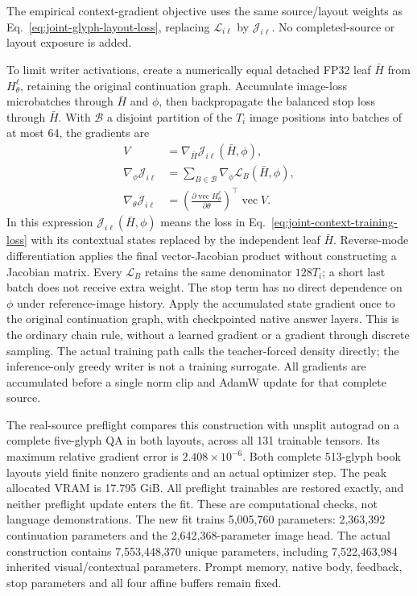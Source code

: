 The empirical context-gradient objective uses the same source/layout weights
as Eq.~\ref{eq:joint-glyph-layout-loss}, replacing $\mathcal L_{i\ell}$ by
$\mathcal J_{i\ell}$. No completed-source or layout exposure is added.

To limit writer activations, create a numerically equal detached FP32 leaf
$\bar H$ from $H_\theta^\ell$, retaining the original continuation graph.
Accumulate image-loss microbatches through $\bar H$ and $\phi$, then backpropagate
the balanced stop loss through $\bar H$. With $\mathcal B$ a disjoint partition
of the $T_i$ image positions into batches of at most 64, the gradients are
\begin{equation}
 \begin{aligned}
 V&=\nabla_{\bar H}\mathcal J_{i\ell}(\bar H,\phi),\\
 \nabla_\phi\mathcal J_{i\ell}
   &=\sum_{B\in\mathcal B}\nabla_\phi\mathcal L_B(\bar H,\phi),\\
 \nabla_\theta\mathcal J_{i\ell}
   &=\left(\frac{\partial\operatorname{vec}H_\theta^\ell}
                    {\partial\theta}\right)^{\!\top}
       \operatorname{vec}V.
 \end{aligned}
 \label{eq:joint-context-state-vjp}
\end{equation}
In this expression $\mathcal J_{i\ell}(\bar H,\phi)$ means the loss in
Eq.~\ref{eq:joint-context-training-loss} with its contextual states replaced by
the independent leaf $\bar H$. Reverse-mode differentiation applies the final
vector-Jacobian product without constructing a Jacobian matrix.
Every $\mathcal L_B$ retains the same denominator $128T_i$; a short last batch
does not receive extra weight. The stop term has no direct dependence on
$\phi$ under reference-image history. Apply the accumulated state gradient
once to the original continuation graph, with checkpointed native answer
layers. This is the ordinary chain rule, without a learned gradient or a
gradient through discrete sampling. The actual training path calls the
teacher-forced density directly; the inference-only greedy writer is not a
training surrogate. All gradients are accumulated before a single norm clip
and AdamW update for that complete source.

The real-source preflight compares this construction with unsplit autograd on
a complete five-glyph QA in both layouts, across all 131 trainable tensors. Its
maximum relative gradient error is $2.408\times10^{-6}$. Both complete 513-glyph
book layouts yield finite nonzero gradients and an actual optimizer step.
The peak allocated VRAM is 17.795 GiB. All preflight trainables are restored
exactly, and neither preflight update enters the fit. These are computational
checks, not language demonstrations. The new fit trains 5,005,760 parameters:
2,363,392 continuation parameters and the 2,642,368-parameter image head.
The actual construction contains 7,553,448,370 unique parameters, including
7,522,463,984 inherited visual/contextual parameters. Prompt memory, native body,
feedback, stop parameters and all four affine buffers remain fixed.

